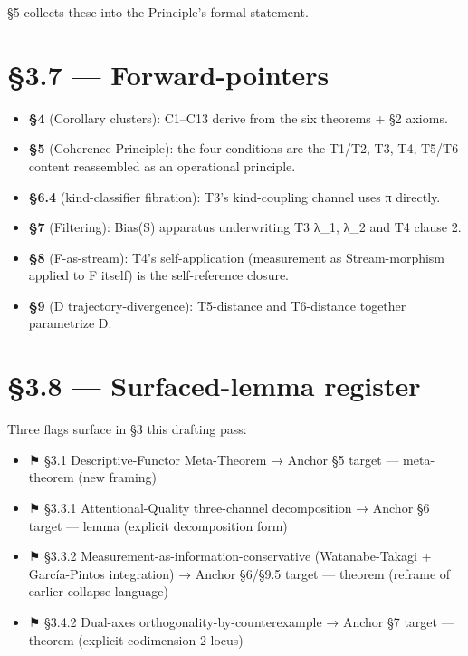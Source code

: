 \documentclass[11pt, openany]{book}
\newcommand{\sectionbreak}{\clearpage}
\begin{document}
§5 collects these into the Principle's formal statement.

\sectionbreak

\section{§3.7 --- Forward-pointers}

\begin{itemize}
\item \textbf{§4} (Corollary clusters): C1–C13 derive from the six theorems + §2 axioms.
\item \textbf{§5} (Coherence Principle): the four conditions are the T1/T2, T3, T4, T5/T6 content reassembled as an operational principle.
\item \textbf{§6.4} (kind-classifier fibration): T3's kind-coupling channel uses π directly.
\item \textbf{§7} (Filtering): Bias(S) apparatus underwriting T3 λ\_\allowbreak{}1, λ\_\allowbreak{}2 and T4 clause 2.
\item \textbf{§8} (F-as-stream): T4's self-application (measurement as Stream-morphism applied to F itself) is the self-reference closure.
\item \textbf{§9} (D trajectory-divergence): T5-distance and T6-distance together parametrize D.
\end{itemize}

\section{§3.8 --- Surfaced-lemma register}

Three flags surface in §3 this drafting pass:

\begin{itemize}
\item ⚑ §3.1 Descriptive-Functor Meta-Theorem → Anchor §5 target --- meta-theorem (new framing)
\item ⚑ §3.3.1 Attentional-Quality three-channel decomposition → Anchor §6 target --- lemma (explicit decomposition form)
\item ⚑ §3.3.2 Measurement-as-information-conservative (Watanabe-Takagi + García-Pintos integration) → Anchor §6/§9.5 target --- theorem (reframe of earlier collapse-language)
\item ⚑ §3.4.2 Dual-axes orthogonality-by-counterexample → Anchor §7 target --- theorem (explicit codimension-2 locus)
\end{itemize}
\end{document}
